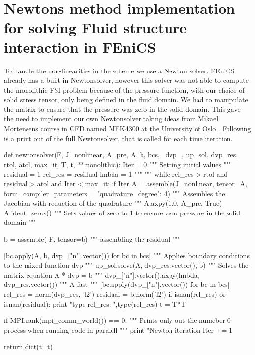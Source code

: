 \section{Newtons method implementation for solving Fluid structure interaction in FEniCS}
To handle the non-linearities in the scheme we use a Newton solver. FEniCS already has a built-in Newtonsolver, however this solver was not able to compute the monolithic FSI problem because of the pressure function, with our choice of solid stress tensor, only being defined in the fluid domain. We had to manipulate the matrix to ensure that the pressure was zero in the solid domain. This gave the need to implement our own Newtonsolver taking ideas from Mikael Mortensens course in CFD named MEK4300 at the University of Oslo \cite{White2006}.
Following is a print out of the full Newtonsolver, that is called for each time iteration.
\newpage
\begin{python}
def newtonsolver(F, J_nonlinear, A_pre, A, b, bcs, \
                dvp_, up_sol, dvp_res, rtol, atol, max_it, T, t, **monolithic):
    Iter      = 0  """ Setting initial values """
    residual   = 1  
    rel_res    = residual
    lmbda = 1 """  """
    while rel_res > rtol and residual > atol and Iter < max_it:
        if Iter %
            A = assemble(J_nonlinear, tensor=A, form_compiler_parameters = {"quadrature_degree": 4}) """ Assembles the Jacobian with reduction of the quadrature """
            A.axpy(1.0, A_pre, True)
            A.ident_zeros()  """ Sets values of zero to 1 to ensure zero pressure in the solid domain """

        b = assemble(-F, tensor=b) """ assembling the residual  """

        [bc.apply(A, b, dvp_["n"].vector()) for bc in bcs] """ Applies boundary conditions to the mixed function dvp """
        up_sol.solve(A, dvp_res.vector(), b) """ Solves the matrix equation A * dvp = b """
        dvp_["n"].vector().axpy(lmbda, dvp_res.vector())   """ A fast   """
        [bc.apply(dvp_["n"].vector()) for bc in bcs] 
        rel_res = norm(dvp_res, 'l2')
        residual = b.norm('l2')                     
        if isnan(rel_res) or isnan(residual):
            print "type rel_res: ",type(rel_res)
            t = T*T

        if MPI.rank(mpi_comm_world()) == 0:   """ Prints only out the numeber 0 process when running code in paralell  """
            print "Newton iteration %
        Iter += 1

    return dict(t=t)
\end{python}




	